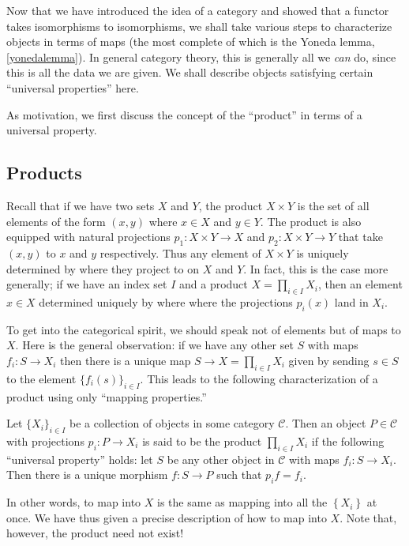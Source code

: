 Now that we have introduced the idea of a category and showed that a functor
takes isomorphisms to isomorphisms, we shall take various steps to characterize objects in terms of
maps (the most complete of which is the Yoneda lemma, \cref{yonedalemma}). In
general category
theory, this is generally all we \emph{can} do, since this is all the data we
are given.
We shall describe objects satisfying certain ``universal properties'' here.


As motivation, we first discuss the concept of the ``product'' in terms of a
universal property.

\subsection{Products}
Recall that if we have two sets $X$ and $Y$, the product $X\times Y$ is the set
of all elements of the form $(x,y)$ where $x\in X$ and $y\in Y$. The product is
also equipped with natural projections $p_1: X \times Y \to X$ and $p_2: X
\times Y \to Y$ that take $(x,y)$ to $x$
and $y$ respectively. Thus any element of $X\times Y$ is uniquely determined by
where they project to on $X$ and $Y$. In fact, this is the case more generally; if
we have an index set $I$ and a product $X=\prod_{i\in I} X_i$, then an element
$x\in X$ determined uniquely by where where the projections $p_i(x)$ land in
$X_i$. 

To get into the categorical spirit, we should speak not of elements but of maps
to $X$. Here is the general observation: if we have any other set $S$ with maps
$f_i:S\rightarrow X_i$ then there is a unique map $S\rightarrow X=\prod_{i\in
I}X_i$ given by sending $s\in S$ to the element $\{ f_i(s)\}_{i\in I}$. This
leads to the following characterization of a product using only ``mapping
properties.''

\begin{definition} Let $\{X_i\}_{i\in I}$ be a collection of objects in some
category $\mathcal{C}$. Then an object $P \in \mathcal{C}$ with projections $p_i: P\rightarrow X_i$
is said to be the product $\prod_{i\in I} X_i$ if the following ``universal
property'' holds:
let $S$ be any other object in $\mathcal{C}$ with maps $f_i:S\rightarrow X_i$.
Then there is a unique morphism $f:S\rightarrow P$ such that $p_i f = f_i$.
\end{definition}

In other words, to map into $X$ is the same as mapping into all the
$\left\{X_i\right\}$ at once. We have thus given a precise description of how
to map into $X$.
Note that, however, the product need not exist! 

